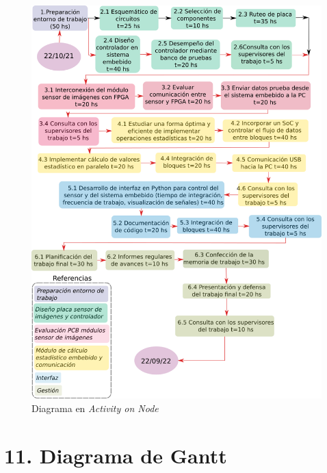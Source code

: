 \documentclass[
11pt, %
codirector, %
]{charter}
\begin{document}
\begin{figure}[htpb]
\centering 
\includegraphics[width=.95\textwidth]{./Figuras/AoN2.png}
\caption{Diagrama en \textit{Activity on Node}}
\label{fig:AoN}
\end{figure}



\section{11. Diagrama de Gantt}
\label{sec:gantt}
\end{document}
